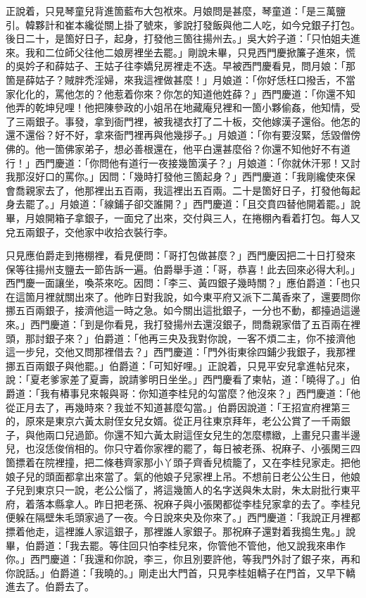正說着，只見琴童兒背進箇藍布大包袱來。月娘問是甚麼，琴童道：「是三萬鹽引。韓夥計和崔本纔從關上掛了號來，爹說打發飯與他二人吃，如今兌銀子打包。後日二十，是箇好日子，起身，打發他三箇往揚州去。」吳大妗子道：「只怕姐夫進來。我和二位師父往他二娘房裡坐去罷。」剛說未畢，只見西門慶掀簾子進來，慌的吳妗子和薛姑子、王姑子往李嬌兒房裡走不迭。早被西門慶看見，問月娘：「那箇是薛姑子？賊胖禿淫婦，來我這裡做甚麼！」月娘道：「你好恁枉口撥舌，不當家化化的，罵他怎的？他惹着你來？你怎的知道他姓薛？」西門慶道：「你還不知他弄的乾坤兒哩！他把陳參政的小姐吊在地藏庵兒裡和一箇小夥偷姦，他知情，受了三兩銀子。事發，拿到衙門裡，被我褪衣打了二十板，交他嫁漢子還俗。他怎的還不還俗？好不好，拿來衙門裡再與他幾拶子。」月娘道：「你有要沒緊，恁毀僧傍佛的。他一箇佛家弟子，想必善根還在，他平白還甚麼俗？你還不知他好不有道行！」{}西門慶道：「你問他有道行一夜接幾箇漢子？」月娘道：「你就休汗邪！又討我那沒好口的罵你。」{}因問：「幾時打發他三箇起身？」西門慶道：「我剛纔使來保會喬親家去了，他那裡出五百兩，我這裡出五百兩。二十是箇好日子，打發他每起身去罷了。」月娘道：「線鋪子卻交誰開？」西門慶道：「且交賁四替他開着罷。」說畢，月娘開箱子拿銀子，一面兌了出來，交付與三人，在捲棚內看着打包。每人又兌五兩銀子，交他家中收拾衣裝行李。

只見應伯爵走到捲棚裡，看見便問：「哥打包做甚麼？」西門慶因把二十日打發來保等往揚州支鹽去一節告訴一遍。伯爵舉手道：「哥，恭喜！此去回來必得大利。」西門慶一面讓坐，喚茶來吃。因問：「李三、黃四銀子幾時關？」應伯爵道：「也只在這箇月裡就關出來了。他昨日對我說，如今東平府又派下二萬香來了，還要問你挪五百兩銀子，接濟他這一時之急。如今關出這批銀子，一分也不動，都擡過這邊來。」西門慶道：「到是你看見，我打發揚州去還沒銀子，問喬親家借了五百兩在裡頭，那討銀子來？」伯爵道：「他再三央及我對你說，一客不煩二主，你不接濟他這一步兒，交他又問那裡借去？」西門慶道：「門外街東徐四鋪少我銀子，我那裡挪五百兩銀子與他罷。」伯爵道：「可知好哩。」正說着，只見平安兒拿進帖兒來，說：「夏老爹家差了夏壽，說請爹明日坐坐。」西門慶看了柬帖，道：「曉得了。」伯爵道：「我有樁事兒來報與哥：你知道李桂兒的勾當麼？他沒來？」西門慶道：「他從正月去了，再幾時來？我並不知道甚麼勾當。」伯爵因說道：「王招宣府裡第三的，原來是東京六黃太尉侄女兒女婿。從正月往東京拜年，老公公賞了一千兩銀子，與他兩口兒過節。你還不知六黃太尉這侄女兒生的怎麼標緻，上畫兒只畫半邊兒，也沒恁俊俏相的。你只守着你家裡的罷了，每日被老孫、祝麻子、小張閑三四箇摽着在院裡撞，把二條巷齊家那小丫頭子齊香兒梳籠了，又在李桂兒家走。把他娘子兒的頭面都拿出來當了。氣的他娘子兒家裡上吊。不想前日老公公生日，他娘子兒到東京只一說，老公公惱了，將這幾箇人的名字送與朱太尉，朱太尉批行東平府，着落本縣拿人。昨日把老孫、祝麻子與小張閑都從李桂兒家拿的去了。李桂兒便躲在隔壁朱毛頭家過了一夜。今日說來央及你來了。」西門慶道：「我說正月裡都摽着他走，這裡誰人家這銀子，那裡誰人家銀子。那祝麻子還對着我搗生鬼。」說畢，伯爵道：「我去罷。等住回只怕李桂兒來，你管他不管他，他又說我來串作你。」西門慶道：「我還和你說，李三，你且別要許他，等我門外討了銀子來，再和你說話。」伯爵道：「我曉的。」剛走出大門首，只見李桂姐轎子在門首，又早下轎進去了。伯爵去了。

